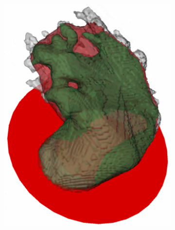 \documentclass[review]{elsarticle}
\begin{document}
\begin{figure}[t]
\begin{subfigure}[b]{.16\linewidth}
    \includegraphics[width=\textwidth]{fig15_4.png}
    \caption{}
  \end{subfigure}%
  \begin{subfigure}[b]{.16\linewidth}
    \centering

\end{subfigure}
\end{figure}
\end{document}
